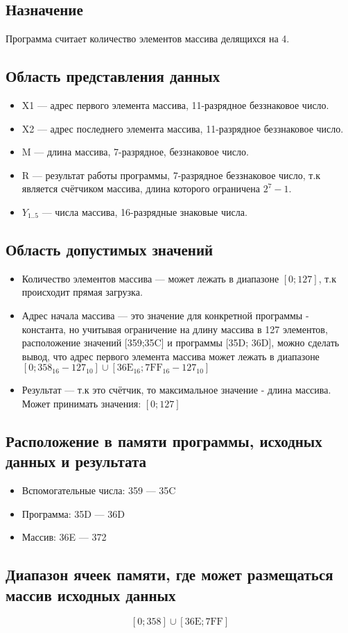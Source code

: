 \subsection{Назначение}
Программа считает количество элементов массива делящихся на 4.

\subsection{Область представления данных}
\begin{itemize}
	\item X1 --- адрес первого элемента массива, 11-разрядное беззнаковое число.
	\item X2 --- адрес последнего элемента массива, 11-разрядное беззнаковое число.
	\item M --- длина массива, 7-разрядное, беззнаковое число. 
	\item R --- результат работы программы, 7-разрядное беззнаковое число, т.к является счётчиком массива, длина которого ограничена $2^ 7-1$.  	
	\item $Y_{1..5}$ --- числа массива, 16-разрядные знаковые числа.
\end{itemize}

\subsection{Область допустимых значений}
\begin{itemize}
	\item Количество элементов массива --- может лежать в диапазоне $[0;127]$, т.к происходит прямая загрузка.
	\item Адрес начала массива --- это значение для конкретной программы - константа, но учитывая ограничение на длину массива в 127 элементов, расположение значений [359;35C] и программы [35D; 36D], можно сделать вывод, что адрес первого элемента массива может лежать в диапазоне $[0;358_{16}-127_{10}] \cup [\mathrm{36E}_{16};\mathrm{7FF}_{16}-127_{10}]$
	\item Результат --- т.к это счётчик, то максимальное значение - длина массива. Может принимать значения: $[0;127]$
\end{itemize}

\subsection{Расположение в памяти программы, исходных данных и результата}
\begin{itemize}
	\item Вспомогательные числа: 359 --- 35C 
	\item Программа: 35D --- 36D
	\item Массив: 36E --- 372
\end{itemize}

\subsection{Диапазон ячеек памяти, где может размещаться массив исходных данных}
\[
	[\mathrm{0};\mathrm{358}] \cup [\mathrm{36E}; \mathrm{7FF}]
\]